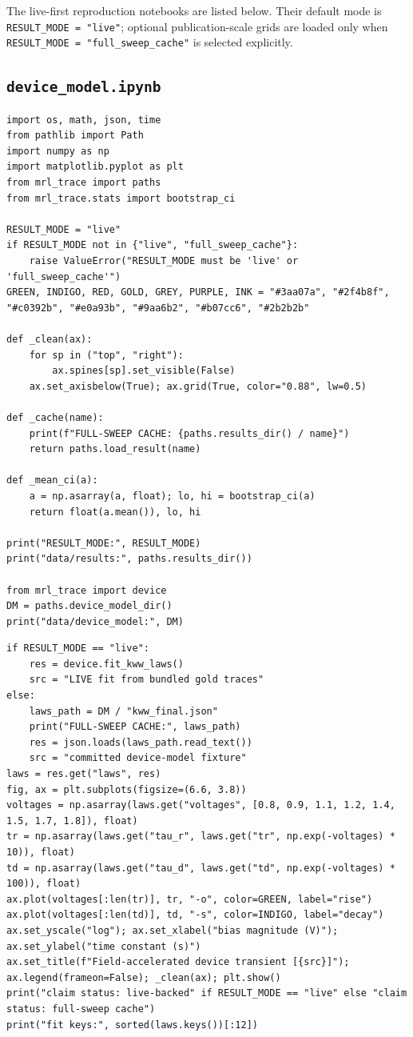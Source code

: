\noindent The live-first reproduction notebooks are listed below. Their default mode is \texttt{RESULT\_MODE = "live"}; optional publication-scale grids are loaded only when \texttt{RESULT\_MODE = "full\_sweep\_cache"} is selected explicitly.

\subsection{\texttt{device\_model.ipynb}}

\begin{lstlisting}[caption={device\_model.ipynb code cell 1},label={lst:mrl-nb-device-model-1}]
import os, math, json, time
from pathlib import Path
import numpy as np
import matplotlib.pyplot as plt
from mrl_trace import paths
from mrl_trace.stats import bootstrap_ci

RESULT_MODE = "live"
if RESULT_MODE not in {"live", "full_sweep_cache"}:
    raise ValueError("RESULT_MODE must be 'live' or 'full_sweep_cache'")
GREEN, INDIGO, RED, GOLD, GREY, PURPLE, INK = "#3aa07a", "#2f4b8f", "#c0392b", "#e0a93b", "#9aa6b2", "#b07cc6", "#2b2b2b"

def _clean(ax):
    for sp in ("top", "right"):
        ax.spines[sp].set_visible(False)
    ax.set_axisbelow(True); ax.grid(True, color="0.88", lw=0.5)

def _cache(name):
    print(f"FULL-SWEEP CACHE: {paths.results_dir() / name}")
    return paths.load_result(name)

def _mean_ci(a):
    a = np.asarray(a, float); lo, hi = bootstrap_ci(a)
    return float(a.mean()), lo, hi

print("RESULT_MODE:", RESULT_MODE)
print("data/results:", paths.results_dir())

from mrl_trace import device
DM = paths.device_model_dir()
print("data/device_model:", DM)
\end{lstlisting}

\begin{lstlisting}[caption={device\_model.ipynb code cell 2},label={lst:mrl-nb-device-model-2}]
if RESULT_MODE == "live":
    res = device.fit_kww_laws()
    src = "LIVE fit from bundled gold traces"
else:
    laws_path = DM / "kww_final.json"
    print("FULL-SWEEP CACHE:", laws_path)
    res = json.loads(laws_path.read_text())
    src = "committed device-model fixture"
laws = res.get("laws", res)
fig, ax = plt.subplots(figsize=(6.6, 3.8))
voltages = np.asarray(laws.get("voltages", [0.8, 0.9, 1.1, 1.2, 1.4, 1.5, 1.7, 1.8]), float)
tr = np.asarray(laws.get("tau_r", laws.get("tr", np.exp(-voltages) * 10)), float)
td = np.asarray(laws.get("tau_d", laws.get("td", np.exp(-voltages) * 100)), float)
ax.plot(voltages[:len(tr)], tr, "-o", color=GREEN, label="rise")
ax.plot(voltages[:len(td)], td, "-s", color=INDIGO, label="decay")
ax.set_yscale("log"); ax.set_xlabel("bias magnitude (V)"); ax.set_ylabel("time constant (s)")
ax.set_title(f"Field-accelerated device transient [{src}]"); ax.legend(frameon=False); _clean(ax); plt.show()
print("claim status: live-backed" if RESULT_MODE == "live" else "claim status: full-sweep cache")
print("fit keys:", sorted(laws.keys())[:12])
\end{lstlisting}

